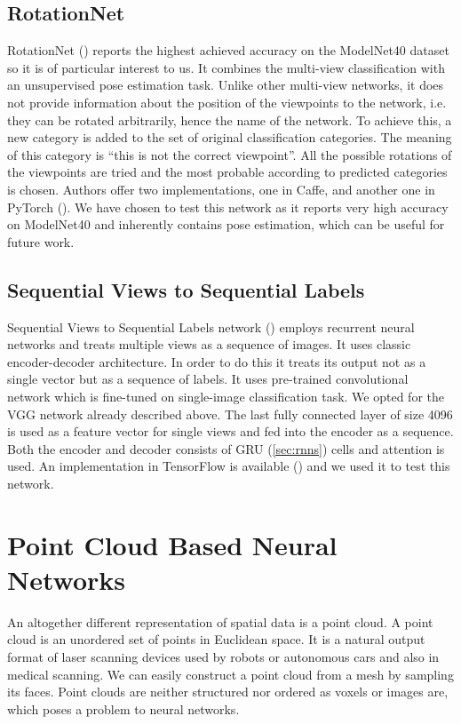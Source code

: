 \subsection{RotationNet}
RotationNet (\cite{kanezaki_rotationnet:_2018}) reports the highest achieved accuracy on the ModelNet40 dataset so it is of particular interest to us. It combines the multi-view classification with an unsupervised pose estimation task. Unlike other multi-view networks, it does not provide information about the position of the viewpoints to the network, i.e. they can be rotated arbitrarily, hence the name of the network. 
To achieve this, a new category is added to the set of original classification categories. The meaning of this category is “this is not the correct viewpoint”. All the possible rotations of the viewpoints are tried and the most probable according to predicted categories is chosen. Authors offer two implementations, one in Caffe, and another one in PyTorch (\cite{kanezaki_rotationnet_2018}). We have chosen to test this network as it reports very high accuracy on ModelNet40 and inherently contains pose estimation, which can be useful for future work.

\subsection{Sequential Views to Sequential Labels}
Sequential Views to Sequential Labels network (\cite{zhizhong_seqviews2seqlabels:_2018}) employs recurrent neural networks and treats multiple views as a sequence of images. It uses classic encoder-decoder architecture. In order to do this it treats its output not as a single vector but as a sequence of labels. It uses pre-trained convolutional network which is fine-tuned on single-image classification task. We opted for the VGG network already described above. The last fully connected layer of size 4096 is used as a feature vector for single views and fed into the encoder as a sequence. Both the encoder and decoder consists of GRU (\autoref{sec:rnns}) cells and attention is used. An implementation in TensorFlow is available (\cite{zhizhong_seq2seq_2018}) and we used it to test this network.

\section{Point Cloud Based Neural Networks}
An altogether different representation of spatial data is a point cloud. A point cloud is an unordered set of points in Euclidean space. It is a natural output format of laser scanning devices used by robots or autonomous cars and also in medical scanning. We can easily construct a point cloud from a mesh by sampling its faces. Point clouds are neither structured nor ordered as voxels or images are, which poses a problem to neural networks.

